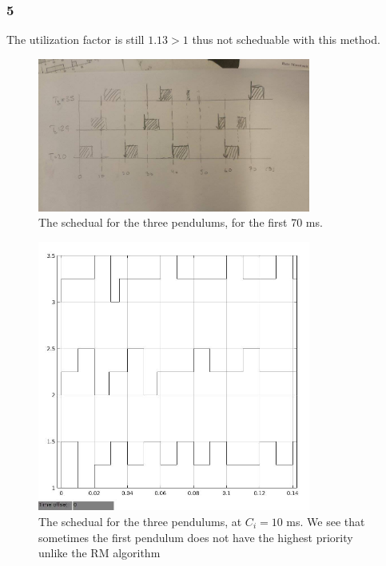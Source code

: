 \documentclass[10pt,a4paper]{article}
\begin{document}
\subsubsection*{5}
The utilization factor is still $1.13>1$ thus not scheduable with this method.
\begin{figure}[!h]
  \centering
    \includegraphics[width=0.8\textwidth]{egen.jpg}
      \caption{The schedual for the three pendulums, for the first 70 ms.}
\end{figure}
\begin{figure}[!h]
  \centering
    \includegraphics[width=0.8\textwidth]{schedual10msedf.jpg}
      \caption{The schedual for the three pendulums, at $C_i=10$ ms. We see that sometimes the first pendulum does not have the highest priority unlike the RM algorithm}
\end{figure}
\end{document}
